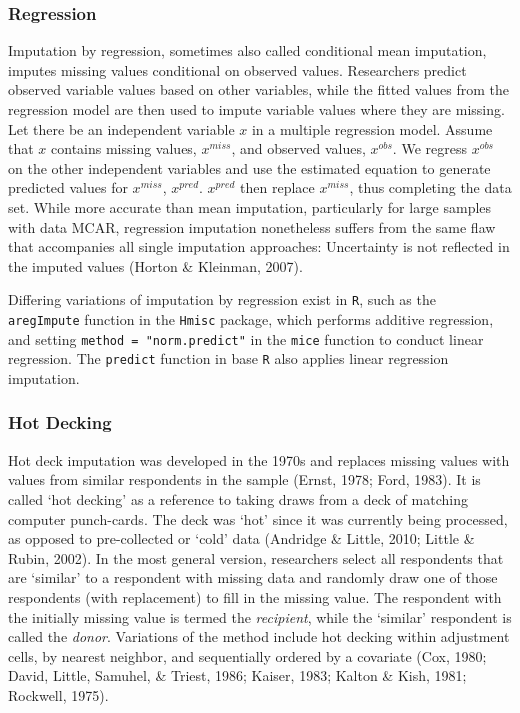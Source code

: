 \documentclass[12pt,econ]{sources/authesis}
\begin{document}
\hypertarget{ordmiss-theory-impute-regress}{%
\subsubsection{Regression}\label{ordmiss-theory-impute-regress}}

Imputation by regression, sometimes also called conditional mean imputation, imputes missing values conditional on observed values. Researchers predict observed variable values based on other variables, while the fitted values from the regression model are then used to impute variable values where they are missing. Let there be an independent variable \(x\) in a multiple regression model. Assume that \(x\) contains missing values, \(x^{miss}\), and observed values, \(x^{obs}\). We regress \(x^{obs}\) on the other independent variables and use the estimated equation to generate predicted values for \(x^{miss}\), \(x^{pred}\). \(x^{pred}\) then replace \(x^{miss}\), thus completing the data set. While more accurate than mean imputation, particularly for large samples with data MCAR, regression imputation nonetheless suffers from the same flaw that accompanies all single imputation approaches: Uncertainty is not reflected in the imputed values (Horton \& Kleinman, 2007).

Differing variations of imputation by regression exist in \texttt{R}, such as the \texttt{aregImpute} function in the \texttt{Hmisc} package, which performs additive regression, and setting \texttt{method\ =\ "norm.predict"} in the \texttt{mice} function to conduct linear regression. The \texttt{predict} function in base \texttt{R} also applies linear regression imputation.

\hypertarget{ordmiss-theory-impute-hd}{%
\subsubsection{Hot Decking}\label{ordmiss-theory-impute-hd}}

Hot deck imputation was developed in the 1970s and replaces missing values with values from similar respondents in the sample (Ernst, 1978; Ford, 1983). It is called `hot decking' as a reference to taking draws from a deck of matching computer punch-cards. The deck was `hot' since it was currently being processed, as opposed to pre-collected or `cold' data (Andridge \& Little, 2010; Little \& Rubin, 2002). In the most general version, researchers select all respondents that are `similar' to a respondent with missing data and randomly draw one of those respondents (with replacement) to fill in the missing value. The respondent with the initially missing value is termed the \textit{recipient}, while the `similar' respondent is called the \textit{donor}. Variations of the method include hot decking within adjustment cells, by nearest neighbor, and sequentially ordered by a covariate (Cox, 1980; David, Little, Samuhel, \& Triest, 1986; Kaiser, 1983; Kalton \& Kish, 1981; Rockwell, 1975).
\end{document}
